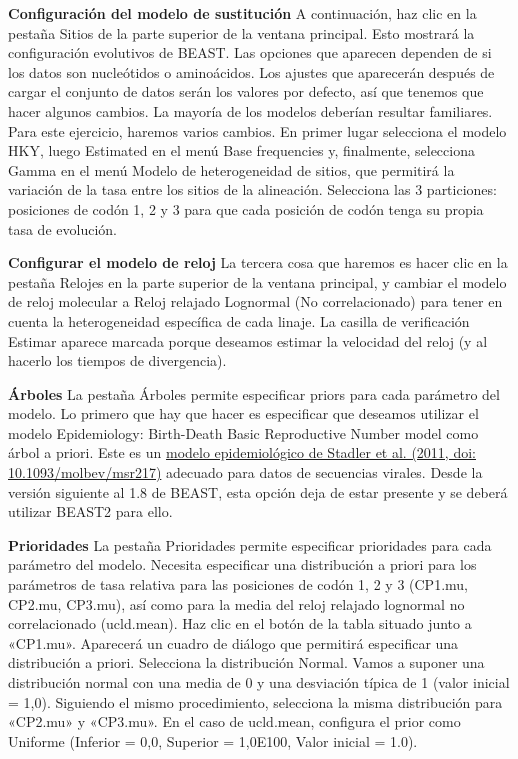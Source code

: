 \textbf{Configuración del modelo de sustitución}
A continuación, haz clic en la pestaña Sitios de la parte superior de la ventana principal. Esto mostrará la configuración evolutivos de BEAST. Las opciones que aparecen dependen de si los datos son nucleótidos o aminoácidos. Los ajustes que aparecerán después de cargar el conjunto de datos serán los valores por defecto, así que tenemos que hacer algunos cambios. La mayoría de los modelos deberían resultar familiares. Para este ejercicio, haremos varios cambios. En primer lugar selecciona el modelo HKY, luego Estimated en el menú Base frequencies y, finalmente, selecciona Gamma en el menú Modelo de heterogeneidad de sitios, que permitirá la variación de la tasa entre los sitios de la alineación. Selecciona las 3 particiones: posiciones de codón 1, 2 y 3 para que cada posición de codón tenga su propia tasa de evolución.

\textbf{Configurar el modelo de reloj}
La tercera cosa que haremos es hacer clic en la pestaña Relojes en la parte superior de la ventana principal, y cambiar el modelo de reloj molecular a Reloj relajado Lognormal (No correlacionado) para tener en cuenta la heterogeneidad específica de cada linaje. La casilla de verificación Estimar aparece marcada porque deseamos estimar la velocidad del reloj (y al hacerlo los tiempos de divergencia).

\textbf{Árboles}
La pestaña Árboles permite especificar priors para cada parámetro del modelo. Lo primero que hay que hacer es especificar que deseamos utilizar el modelo Epidemiology: Birth-Death Basic Reproductive Number model como árbol a priori. Este es un \href{https://academic.oup.com/mbe/article/29/1/347/1750040}{modelo epidemiológico de Stadler et al. (2011, doi: 10.1093/molbev/msr217)} adecuado para datos de secuencias virales. Desde la versión siguiente al 1.8 de BEAST, esta opción deja de estar presente y se deberá utilizar BEAST2 para ello.

\textbf{Prioridades}
La pestaña Prioridades permite especificar prioridades para cada parámetro del modelo. Necesita especificar una distribución a priori para los parámetros de tasa relativa para las posiciones de codón 1, 2 y 3 (CP1.mu, CP2.mu, CP3.mu), así como para la media del reloj relajado lognormal no correlacionado (ucld.mean). Haz clic en el botón de la tabla situado junto a «CP1.mu». Aparecerá un cuadro de diálogo que permitirá especificar una distribución a priori. Selecciona la distribución Normal. Vamos a suponer una distribución normal con una media de 0 y una desviación típica de 1 (valor inicial = 1,0). Siguiendo el mismo procedimiento, selecciona la misma distribución para «CP2.mu» y «CP3.mu». En el caso de ucld.mean, configura el prior como Uniforme (Inferior = 0,0, Superior = 1,0E100, Valor inicial = 1.0).


